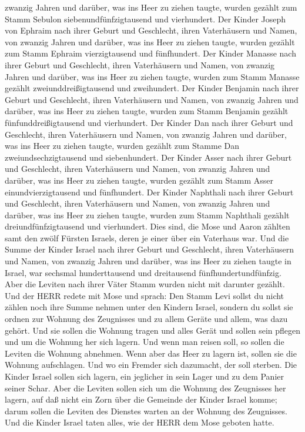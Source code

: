 zwanzig Jahren und darüber, was ins Heer zu ziehen taugte, 
wurden gezählt zum Stamm Sebulon siebenundfünfzigtausend und
vierhundert.  Der Kinder Joseph von Ephraim nach ihrer
Geburt und Geschlecht, ihren Vaterhäusern und Namen, von zwanzig Jahren
und darüber, was ins Heer zu ziehen taugte,  wurden gezählt
zum Stamm Ephraim vierzigtausend und fünfhundert.  Der
Kinder Manasse nach ihrer Geburt und Geschlecht, ihren Vaterhäusern und
Namen, von zwanzig Jahren und darüber, was ins Heer zu ziehen taugte,
 wurden zum Stamm Manasse gezählt zweiunddreißigtausend und
zweihundert.  Der Kinder Benjamin nach ihrer Geburt und
Geschlecht, ihren Vaterhäusern und Namen, von zwanzig Jahren und
darüber, was ins Heer zu ziehen taugte,  wurden zum Stamm
Benjamin gezählt fünfunddreißigtausend und vierhundert. 
Der Kinder Dan nach ihrer Geburt und Geschlecht, ihren Vaterhäusern und
Namen, von zwanzig Jahren und darüber, was ins Heer zu ziehen taugte,
 wurden gezählt zum Stamme Dan zweiundsechzigtausend und
siebenhundert.  Der Kinder Asser nach ihrer Geburt und
Geschlecht, ihren Vaterhäusern und Namen, von zwanzig Jahren und
darüber, was ins Heer zu ziehen taugte,  wurden gezählt zum
Stamm Asser einundvierzigtausend und fünfhundert.  Der
Kinder Naphthali nach ihrer Geburt und Geschlecht, ihren Vaterhäusern
und Namen, von zwanzig Jahren und darüber, was ins Heer zu ziehen
taugte,  wurden zum Stamm Naphthali gezählt
dreiundfünfzigtausend und vierhundert.  Dies sind, die Mose
und Aaron zählten samt den zwölf Fürsten Israels, deren je einer über
ein Vaterhaus war.  Und die Summe der Kinder Israel nach
ihrer Geburt und Geschlecht, ihren Vaterhäusern und Namen, von zwanzig
Jahren und darüber, was ins Heer zu ziehen taugte in Israel,
 war sechsmal hunderttausend und dreitausend
fünfhundertundfünfzig.  Aber die Leviten nach ihrer Väter
Stamm wurden nicht mit darunter gezählt.  Und der HERR
redete mit Mose und sprach:  Den Stamm Levi sollst du nicht
zählen noch ihre Summe nehmen unter den Kindern Israel, 
sondern du sollst sie ordnen zur Wohnung des Zeugnisses und zu allem
Geräte und allem, was dazu gehört. Und sie sollen die Wohnung tragen und
alles Gerät und sollen sein pflegen und um die Wohnung her sich lagern.
 Und wenn man reisen soll, so sollen die Leviten die
Wohnung abnehmen. Wenn aber das Heer zu lagern ist, sollen sie die
Wohnung aufschlagen. Und wo ein Fremder sich dazumacht, der soll
sterben.  Die Kinder Israel sollen sich lagern, ein
jeglicher in sein Lager und zu dem Panier seiner Schar. 
Aber die Leviten sollen sich um die Wohnung des Zeugnisses her lagern,
auf daß nicht ein Zorn über die Gemeinde der Kinder Israel komme; darum
sollen die Leviten des Dienstes warten an der Wohnung des Zeugnisses.
 Und die Kinder Israel taten alles, wie der HERR dem Mose
geboten hatte.

